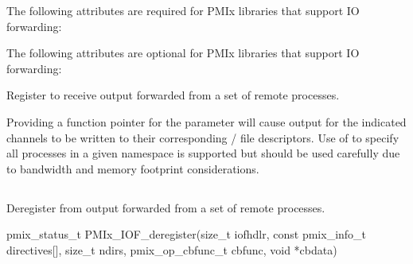 \reqattrstart
The following attributes are required for \ac{PMIx} libraries that support \ac{IO} forwarding:


\reqattrend

\optattrstart
The following attributes are optional for \ac{PMIx} libraries that support \ac{IO} forwarding:


\optattrend

\descr

Register to receive output forwarded from a set of remote processes.

\adviceuserstart
Providing a  function pointer for the  parameter will cause output for the indicated channels to be written to their corresponding / file descriptors. Use of  to specify all processes in a given namespace is supported but should be used carefully due to bandwidth and memory footprint considerations.
\adviceuserend


\subsection{}

\summary

Deregister from output forwarded from a set of remote processes.

\format

\cspecificstart
\begin{codepar}
pmix_status_t
PMIx_IOF_deregister(size_t iofhdlr,
                    const pmix_info_t directives[], size_t ndirs,
                    pmix_op_cbfunc_t cbfunc, void *cbdata)
\end{codepar}
\cspecificend

\begin{arglist}
\end{arglist}

